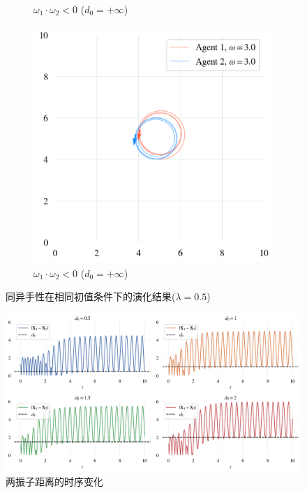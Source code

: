 \documentclass{article}
\begin{document}
\begin{figure}[H]
\begin{subfigure}[b]{0.49\textwidth}
		\vspace{-1cm}
		\caption{$\omega_1 \cdot \omega_2 < 0$ ($d_0=+\infty$)}
	\end{subfigure}
	\begin{subfigure}[b]{0.49\textwidth}
		\includegraphics[width=\textwidth]{./figs/sameChirInf.png}
		\vspace{-1cm}
		\caption{$\omega_1 \cdot \omega_2 < 0$ ($d_0=+\infty$)}
	\end{subfigure}
	\caption{同异手性在相同初值条件下的演化结果($\lambda=0.5$)}
	\label{fig:fig2.6.chir}
\end{figure}

\newpage

\begin{figure}[H]
	\centering
	\includegraphics[width=\textwidth]{./figs/2particalDis.png}
	\vspace{-0.5cm}
	\caption{两振子距离的时序变化}
	\label{fig:fig2.6.dis}
\end{figure}
\end{document}
